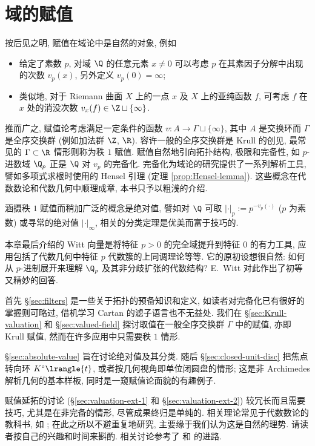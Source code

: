 
\chapter{域的赋值}
按后见之明, 赋值在域论中是自然的对象, 例如
\begin{itemize}
	\item 给定了素数 $p$, 对域 $\Q$ 的任意元素 $x \neq 0$ 可以考虑 $p$ 在其素因子分解中出现的次数 $v_p(x)$, 另外定义 $v_p(0)=\infty$;
	\item 类似地, 对于 Riemann 曲面 $X$ 上的一点 $x$ 及 $X$ 上的亚纯函数 $f$, 可考虑 $f$ 在 $x$ 处的消没次数 $v_x(f) \in \Z \sqcup \{\infty\}$.
\end{itemize}
推而广之, 赋值论考虑满足一定条件的函数 $v: A \to \Gamma \sqcup \{\infty\}$, 其中 $A$ 是交换环而 $\Gamma$ 是全序交换群 (例如加法群 $\Z$, $\R$). 容许一般的全序交换群是 Krull 的创见, 最常见的 $\Gamma \subset \R$ 情形则称为秩 $1$ 赋值. 赋值自然地引向拓扑结构, 极限和完备性, 如 $p$-进数域 $\Q_p$ 正是 $\Q$ 对 $v_p$ 的完备化. 完备化为域论的研究提供了一系列解析工具, 譬如多项式求根时使用的 Hensel 引理 (定理 \ref{prop:Hensel-lemma}). 这些概念在代数数论和代数几何中顺理成章, 本书只予以粗浅的介绍.

涵摄秩 $1$ 赋值而稍加广泛的概念是绝对值, 譬如对 $\Q$ 可取 $|\cdot|_p := p^{-v_p(\cdot)}$ ($p$ 为素数) 或寻常的绝对值 $|\cdot|_\infty$, 相关的分类定理是优美而富于技巧的.

本章最后介绍的 Witt 向量是将特征 $p > 0$ 的完全域提升到特征 $0$ 的有力工具, 应用包括了代数几何中特征 $p$ 代数簇的上同调理论等等. 它的原初设想很自然: 如何从 $p$-进制展开来理解 $\Q_p$ 及其非分歧扩张的代数结构? E.\ Witt 对此作出了初等又精妙的回答.

\begin{wenxintishi}
	首先 \S\ref{sec:filters} 是一些关于拓扑的预备知识和定义, 如读者对完备化已有很好的掌握则可略过, 借机学习 Cartan 的滤子语言也不无益处. 我们在 \S\ref{sec:Krull-valuation} 和 \S\ref{sec:valued-field} 探讨取值在一般全序交换群 $\Gamma$ 中的赋值, 亦即 Krull 赋值, 然而在许多应用中只需要秩 $1$ 情形.
	
	\S\ref{sec:absolute-value} 旨在讨论绝对值及其分类. 随后 \S\ref{sec:closed-unit-disc} 把焦点转向环 $K^\circ \lrangle{t}$, 或者按几何视角即单位闭圆盘的情形; 这是非 Archimedes 解析几何的基本样板, 同时是一窥赋值论面貌的有趣例子.

	赋值延拓的讨论 (\S\ref{sec:valuation-ext-1} 和 \S\ref{sec:valuation-ext-2}) 较冗长而且需要技巧, 尤其是在非完备的情形, 尽管成果终归是单纯的. 相关理论常见于代数数论的教科书, 如 \cite{Lai16}; 在此之所以不避重复地研究, 主要缘于我们认为这是自然的理势. 请读者按自己的兴趣和时间来斟酌. 相关讨论参考了 \cite[Chapter XII]{Lang02} 和 \cite[Chapter II]{Neu99} 的进路.
\end{wenxintishi}

